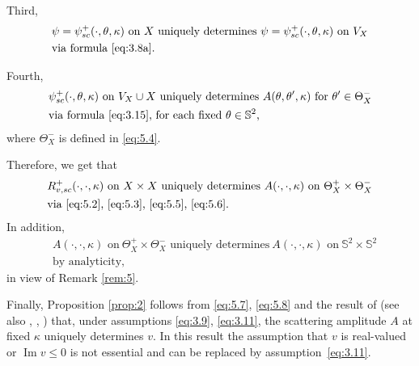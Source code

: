 \documentclass[JEP,XML,SOM,Unicode,NoEqCountersInSection,published]{cedram}
\renewcommand{\Im}{\mathop{\mathrm{Im}}}
\theoremstyle{definition}
\begin{document}
Third,
\begin{equation}
\begin{aligned}
&\psi=\psi_{sc}^+(\cdot, \theta,\kappa)\text{ on}\ X\text{ uniquely determines}\ \psi=\psi_{sc}^+(\cdot, \theta,\kappa)\text{ on}\ V_X \label{eq:5.5}\\
&\text{via formula \eqref{eq:3.8a}}.
\end{aligned}
\end{equation}

Fourth,\vspace*{-3pt}
\begin{equation}\label{eq:5.6}
\begin{aligned}
&\psi_{sc}^+(\cdot, \theta,\kappa)\text{ on}\ V_X \cup X\text{ uniquely determines}\ A(\theta, \theta', \kappa)\text{ for}\ \theta' \in \Theta_X^-\\
&\text{via formula \eqref{eq:3.15},  for each fixed $\theta \in\mathbb S^2$,}
\end{aligned}
\end{equation}
where $\Theta_X^-$ is defined in \eqref{eq:5.4}.

Therefore, we get that\vspace*{-3pt}
\begin{equation}\label{eq:5.7}
\begin{aligned}
&R_{v,sc}^+(\cdot, \cdot, \kappa)\text{ on}\ X\times X\text{ uniquely determines}\ A(\cdot, \cdot, \kappa)\text{ on}\ \Theta_X^+ \times \Theta_X^-\\
&\text{via \eqref{eq:5.2}, \eqref{eq:5.3}, \eqref{eq:5.5}, \eqref{eq:5.6}.}
\end{aligned}
\end{equation}
In addition,\vspace*{-3pt}
\begin{equation}\label{eq:5.8}
\begin{aligned}
&A(\cdot, \cdot, \kappa)\text{ on}\ \Theta_X^+ \times \Theta_X^-\text{ uniquely determines}\ A(\cdot, \cdot, \kappa)\text{ on}\ \mathbb S^2 \times \mathbb S^2 \\
&\text{by analyticity},
\end{aligned}
\end{equation}
in view of Remark \ref{rem:5}.

Finally, Proposition \ref{prop:2} follows from \eqref{eq:5.7}, \eqref{eq:5.8} and the result of \cite{N1988} (see also \cite{N1994}, \cite{HH}, \cite{E}) that,
under assumptions \eqref{eq:3.9}, \eqref{eq:3.11}, the scattering amplitude $A$ at fixed $\kappa$ uniquely determines $v$.
In this result the assumption that $v$ is real-valued or $\Im v \leq 0$ is not essential and can be replaced by assumption~\eqref{eq:3.11}.
\end{document}
